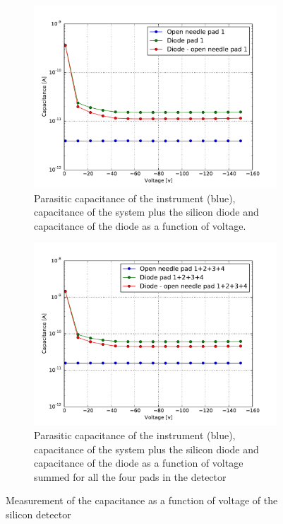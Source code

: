 \documentclass[12pt]{article}
\begin{document}
\begin{figure}[t!]
  \centering
  \begin{subfigure}[t]{0.45\textwidth}
    \includegraphics[width=1.2\textwidth]{./graphics/V_vs_C}
    \caption{Parasitic capacitance of the instrument (blue), capacitance of the system plus the silicon diode and capacitance of the diode as a function of voltage.}
    \label{fig:VC_curve_single}
  \end{subfigure}
  \hfill
  \begin{subfigure}[t]{0.45\textwidth}
    \includegraphics[width=1.2\textwidth]{./graphics/V_vs_C_total}
    \caption{Parasitic capacitance of the instrument (blue), capacitance of the system plus the silicon diode and capacitance of the diode as a function of voltage summed for all the four pads in the detector}
    \label{fig:VC_curve_total}
  \end{subfigure}
\caption{Measurement of the capacitance as a function of voltage of the silicon detector}
\label{fig:VC_curve}
\end{figure}
\end{document}
